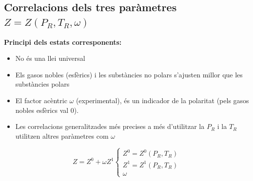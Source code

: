 \documentclass[a4paper]{article}
\begin{document}
\subsection{Correlacions dels tres paràmetres $Z=Z(P_R,T_R, \omega)$}

\textbf{Principi dels estats corresponents:}

\begin{itemize}
    \item No és una llei universal
    \item Els gasos nobles (esfèrics) i les substàncies no polars s'ajusten millor que les substàncies polars
    \item El factor acèntric $\omega$ (experimental), és un indicador de la polaritat (pels gasos nobles esfèrics val 0).
    \item Les correlacions generalitzades més precises a més d'utilitzar la $P_R$ i la $T_R$ utilitzen altres paràmetres com $\omega$
\end{itemize}

$$
Z = Z^0 + \omega Z^1 
\begin{cases}
Z^0 = Z^0(P_R, T_R) \\
Z^1 = Z^1(P_R, T_R) \\
\omega
\end{cases}
$$
\end{document}
